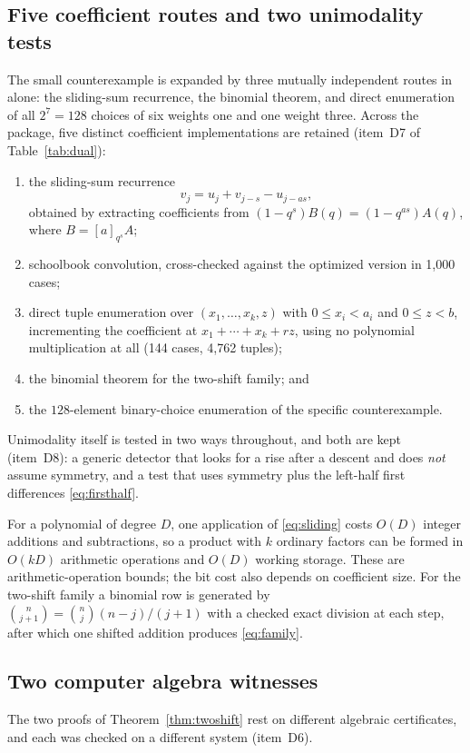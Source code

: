 \documentclass[11pt]{article}
\theoremstyle{research}
\theoremstyle{definition}
\newcommand{\qir}[2]{[#1]_{q^{#2}}}
\numberwithin{equation}{section}
\begin{document}
\subsection{Five coefficient routes and two unimodality tests}
The small counterexample is expanded by three mutually independent routes
in  alone: the sliding-sum recurrence, the
binomial theorem, and direct enumeration of all $2^7=128$ choices of six
weights one and one weight three. Across the package, five distinct
coefficient implementations are retained (item~D7 of
Table~\ref{tab:dual}):
\begin{enumerate}[label=(\roman*)]
\item the sliding-sum recurrence
  \begin{equation}\label{eq:sliding}
   v_j=u_j+v_{j-s}-u_{j-as},
  \end{equation}
  obtained by extracting coefficients from
  $(1-q^s)B(q)=(1-q^{as})A(q)$, where $B=\qir as A$;
\item schoolbook convolution, cross-checked against the optimized version
  in 1,000 cases;
\item direct tuple enumeration over $(x_1,\ldots,x_k,z)$ with
  $0\le x_i<a_i$ and $0\le z<b$, incrementing the coefficient at
  $x_1+\cdots+x_k+rz$, using no polynomial multiplication at all
  (144 cases, 4,762 tuples);
\item the binomial theorem for the two-shift family; and
\item the $128$-element binary-choice enumeration of the specific
  counterexample.
\end{enumerate}
Unimodality itself is tested in two ways throughout, and both are kept
(item~D8): a generic detector that looks for a rise after a descent and
does \emph{not} assume symmetry, and a test that uses symmetry plus the
left-half first differences \eqref{eq:firsthalf}.

For a polynomial of degree $D$, one application of \eqref{eq:sliding}
costs $O(D)$ integer additions and subtractions, so a product with $k$
ordinary factors can be formed in $O(kD)$ arithmetic operations and $O(D)$
working storage. These are arithmetic-operation bounds; the bit cost also
depends on coefficient size. For the two-shift family a binomial row is
generated by $\binom n{j+1}=\binom nj(n-j)/(j+1)$ with a checked exact
division at each step, after which one shifted addition produces
\eqref{eq:family}.

\subsection{Two computer algebra witnesses}
\label{sec:verification-cas}
The two proofs of Theorem~\ref{thm:twoshift} rest on different algebraic
certificates, and each was checked on a different system (item~D6).
\end{document}
